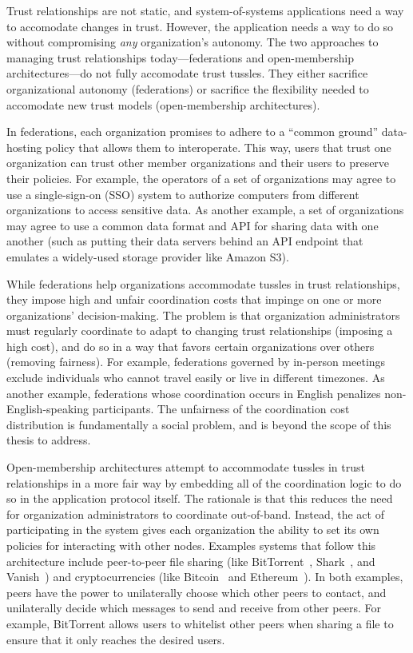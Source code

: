 Trust relationships are not static, and system-of-systems applications need a
way to accomodate changes in trust.  However, the application needs a way to do
so without compromising \emph{any} organization's autonomy.  
The two approaches to managing trust relationships today---federations and open-membership
architectures---do not fully accomodate trust tussles.  They 
either sacrifice organizational autonomy (federations) or sacrifice 
the flexibility needed to accomodate new trust models (open-membership
architectures).

In federations, each organization promises to adhere to a
``common ground'' data-hosting policy that allows them to interoperate.
This way, users that trust one organization can trust other member organizations
and their users to preserve their policies.
For example, the operators of a set of organizations may agree to use a
single-sign-on (SSO) system to authorize computers from different organizations
to access sensitive data.  As another example, a set of organizations may agree
to use a common data format and API for sharing data with one another (such as
putting their data servers behind an API endpoint that emulates a widely-used
storage provider like Amazon S3).

While federations help organizations accommodate
tussles in trust relationships, they impose high and unfair coordination costs
that impinge on one or more organizations' decision-making.  The problem is 
that organization administrators must regularly coordinate to adapt
to changing trust relationships (imposing a high cost), and do so in a way that
favors certain organizations over others (removing fairness).  For example,
federations governed by in-person meetings exclude individuals who cannot
travel easily or live in different timezones.
As another example, federations whose coordination occurs in English
penalizes non-English-speaking participants.  The unfairness of the
coordination cost distribution is fundamentally a social problem, and is beyond
the scope of this thesis to address.

Open-membership architectures attempt to accommodate tussles in trust
relationships in a more fair way by embedding all of the coordination logic to do so in the
application protocol itself.  The rationale is
that this reduces the need for organization administrators to coordinate
out-of-band.  Instead, the act of participating in the system gives
each organization the ability to set its own policies for interacting with other
nodes.  Examples systems that follow this architecture include peer-to-peer file sharing
(like BitTorrent~\cite{bittorrent}, Shark~\cite{shark}, and Vanish~\cite{vanish})
and cryptocurrencies (like Bitcoin~\cite{bitcoin} and Ethereum~\cite{ethereum}).
In both examples, peers have the power to unilaterally choose which other peers to contact, and
unilaterally decide which messages to send and receive from other peers.  For
example, BitTorrent allows users to whitelist other peers when sharing a file to
ensure that it only reaches the desired users.

